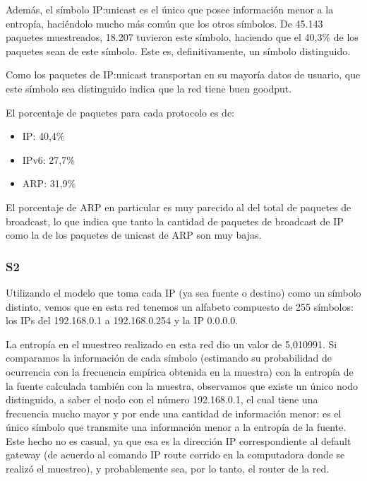 Además, el símbolo IP:unicast es el único que posee información menor a la
entropía, haciéndolo mucho más común que los otros símbolos. De 45.143 paquetes
muestreados, 18.207 tuvieron este símbolo, haciendo que el 40,3\% de los paquetes
sean de este símbolo. Este es, definitivamente, un símbolo distinguido.

Como los paquetes de IP:unicast transportan en su mayoría datos de usuario,
que este símbolo sea distinguido indica que la red tiene buen goodput.


El porcentaje de paquetes para cada protocolo es de:
\begin{itemize}
	\item IP: 40,4\%
	\item IPv6: 27,7\%
	\item ARP: 31,9\%
\end{itemize}

El porcentaje de ARP en particular es muy parecido al del total de paquetes de
broadcast, lo que indica que tanto la cantidad de paquetes de broadcast de IP
como la de los paquetes de unicast de ARP son muy bajas.



\subsubsection{S2}

Utilizando el modelo que toma cada IP (ya sea fuente o destino) como
un símbolo distinto, vemos que en esta red tenemos un alfabeto
compuesto de 255 símbolos: los IPs del 192.168.0.1 a 192.168.0.254 y
la IP 0.0.0.0.

La entropía en el muestreo realizado en esta red dio un valor de
5,010991. Si comparamos la información de cada símbolo (estimando su
probabilidad de ocurrencia con la frecuencia empírica obtenida en la
muestra) con la entropía de la fuente calculada también con la
muestra, observamos que existe un único nodo distinguido, a saber el
nodo con el número 192.168.0.1, el cual tiene una frecuencia mucho
mayor y por ende una cantidad de información menor: es el único
símbolo que transmite una información menor a la entropía de la
fuente. Este hecho no es casual, ya que esa es la dirección IP correspondiente al
default gateway (de acuerdo al comando IP route corrido en la
computadora donde se realizó el muestreo), y probablemente sea, por lo
tanto, el router de la red.

